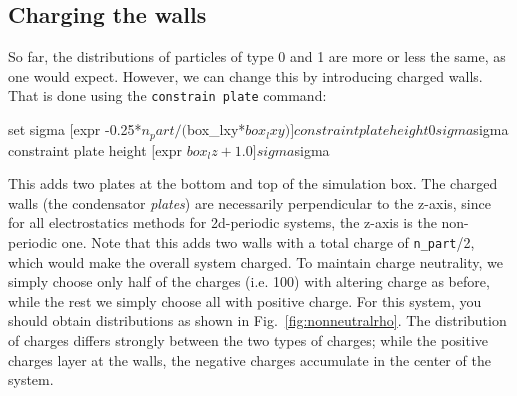 \documentclass[
a4paper,                        %
11pt,                           %
twoside,                        %
footsepline,                    %
headsepline,                    %
headexclude,                    %
footexclude,                    %
pagesize,                       %
]{scrartcl}
\begin{document}
\subsection*{Charging the walls}

So far, the distributions of particles of type 0 and 1 are more or
less the same, as one would expect. However, we can change this by
introducing charged walls. That is done using the
\verb|constrain plate| command:

\begin{tclcode}
  set sigma [expr -0.25*$n_part/($box_lxy*$box_lxy)]
  constraint plate height 0 sigma $sigma
  constraint plate height [expr $box_lz + 1.0] sigma $sigma
\end{tclcode}

This adds two plates at the bottom and top of the simulation box. The
charged walls (the condensator \emph{plates}) are necessarily
perpendicular to the z-axis, since for all electrostatics methods for
2d-periodic systems, the z-axis is the non-periodic one. Note that
this adds two walls with a total charge of \verb|n_part|/2, which
would make the overall system charged. To maintain charge neutrality,
we simply choose only half of the charges (i.e. 100) with altering
charge as before, while the rest we simply choose all with positive
charge. For this system, you should obtain distributions as shown in
Fig.~\ref{fig:nonneutralrho}. The distribution of charges differs
strongly between the two types of charges; while the positive charges
layer at the walls, the negative charges accumulate in the center of
the system.
\end{document}
